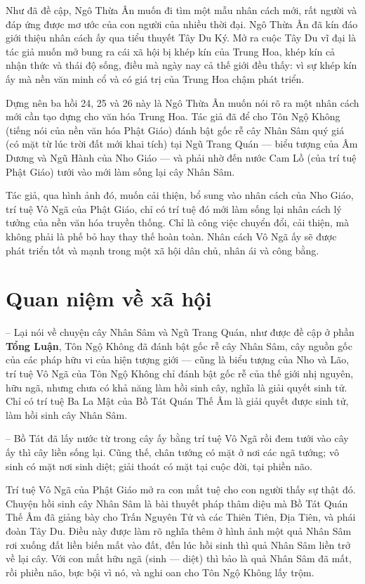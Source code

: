 Như đã đề cập, Ngô Thừa Ân muốn đi tìm một mẫu nhân cách mới, rất người và đáp ứng được mơ ước của con người của nhiều thời đại. Ngô Thừa Ân đã kín đáo giới thiệu nhân cách ấy qua tiểu thuyết Tây Du Ký. Mở ra cuộc Tây Du vĩ đại là tác giả muốn mở bung ra cái xã hội bị khép kín của Trung Hoa, khép kín cả nhận thức và thái độ sống, điều mà ngày nay cả thế giới đều thấy: vì sự khép kín ấy mà nền văn minh cổ và có giá trị của Trung Hoa chậm phát triển.

Dựng nên ba hồi 24, 25 và 26 này là Ngô Thừa Ân muốn nói rõ ra một nhân cách mới cần tạo dựng cho văn hóa Trung Hoa. Tác giả đã để cho Tôn Ngộ Không (tiếng nói của nền văn hóa Phật Giáo) đánh bật gốc rễ cây Nhân Sâm quý giá (có mặt từ lúc trời đất mới khai tích) tại Ngũ Trang Quán --- biểu tượng của Âm Dương và Ngũ Hành của Nho Giáo --- và phải nhờ đến nước Cam Lồ (của trí tuệ Phật Giáo) tưới vào mới làm sống lại cây Nhân Sâm.

Tác giả, qua hình ảnh đó, muốn cải thiện, bổ sung vào nhân cách của Nho Giáo, trí tuệ Vô Ngã của Phật Giáo, chỉ có trí tuệ đó mới làm sống lại nhân cách lý tưởng của nền văn hóa truyền thống. Chỉ là công việc chuyển đổi, cải thiện, mà không phải là phế bỏ hay thay thế hoàn toàn. Nhân cách Vô Ngã ấy sẽ được phát triển tốt và mạnh trong một xã hội dân chủ, nhân ái và công bằng.

\section{Quan niệm về xã hội} %
\label{sec:24_25_26_xa_hoi}

-- Lại nói về chuyện cây Nhân Sâm và Ngũ Trang Quán, như được đề cập ở phần {\bf Tổng Luận}, Tôn Ngộ Không đã đánh bật gốc rễ cây Nhân Sâm, cây nguồn gốc của các pháp hữu vi của hiện tượng giới --- cũng là biểu tượng của Nho và Lão, trí tuệ Vô Ngã của Tôn Ngộ Không chỉ đánh bật gốc rễ của thế giới nhị nguyên, hữu ngã, nhưng chưa có khả năng làm hồi sinh cây, nghĩa là giải quyết sinh tử. Chỉ có trí tuệ Ba La Mật của Bồ Tát Quán Thế Âm là giải quyết được sinh tử, làm hồi sinh cây Nhân Sâm.

-- Bồ Tát đã lấy nước từ trong cây ấy bằng trí tuệ Vô Ngã rồi đem tưới vào cây ấy thì cây liền sống lại. Cũng thế, chân tướng có mặt ở nơi các ngã tướng; vô sinh có mặt nơi sinh diệt; giải thoát có mặt tại cuộc đời, tại phiền não.

Trí tuệ Vô Ngã của Phật Giáo mở ra con mắt tuệ cho con người thấy sự thật đó. Chuyện hồi sinh cây Nhân Sâm là bài thuyết pháp thâm diệu mà Bồ Tát Quán Thế Âm đã giảng bày cho Trấn Nguyên Tử và các Thiên Tiên, Địa Tiên, và phái đoàn Tây Du. Điều này được làm rõ nghĩa thêm ở hình ảnh một quả Nhân Sâm rơi xuống đất liền biến mất vào đất, đến lúc hồi sinh thì quả Nhân Sâm liền trở về lại cây. Với con mắt hữu ngã (sinh --- diệt) thì bảo là quả Nhân Sâm đã mất, rồi phiền não, bực bội vì nó, và nghi oan cho Tôn Ngộ Không lấy trộm.

